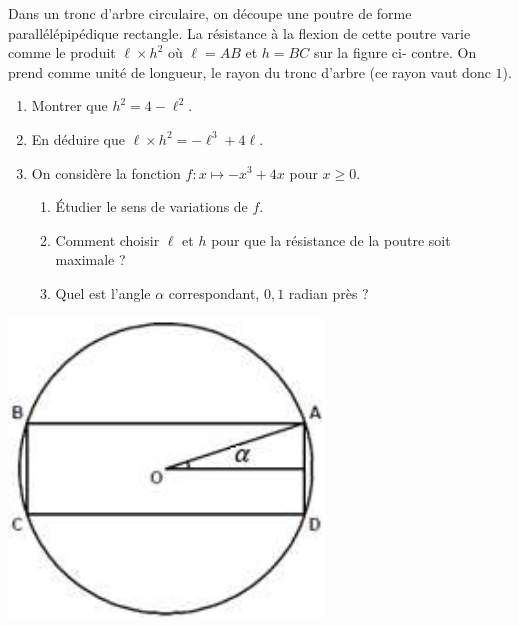\documentclass[11pt]{article}
\begin{document}
\begin{exo}
Dans un tronc d’arbre circulaire, on découpe une poutre de forme parallélépipédique rectangle.
La résistance à la flexion de cette poutre varie comme le produit $\ell\times
h^2$ où $\ell =AB$ et $h = BC$ sur la figure ci-
contre. On prend comme unité de longueur, le rayon du tronc d’arbre (ce rayon
vaut donc $1$).\\
\begin{minipage}{.6\textwidth}
  \begin{enumerate}
    \item Montrer que $h^2=4-\ell^2$.
    \item En déduire que $\ell\times h^2=-\ell^3+4\ell$.
    \item On considère la fonction $f:x\mapsto -x^3+4x$ pour $x\geq0$.
      \begin{enumerate}
        \item Étudier le sens de variations de $f$.
        \item Comment choisir $\ell$ et $h$ pour que la résistance de la poutre
          soit maximale ?
        \item Quel est l'angle $\alpha$ correspondant, $0,1$ radian près ?
      \end{enumerate}
  \end{enumerate}
\end{minipage}
\begin{minipage}{.4\textwidth}
  \begin{center}
    \includegraphics[scale=.4]{poutre.png}
  \end{center}
\end{minipage}
\end{exo}
\end{document}
